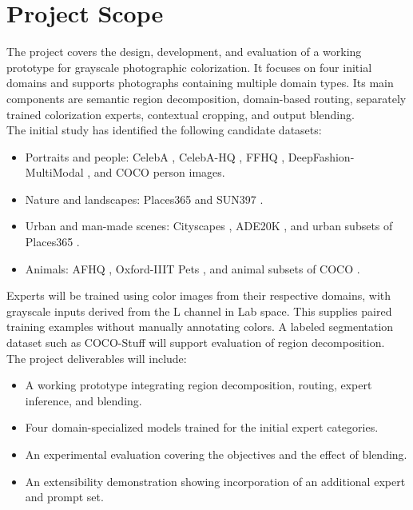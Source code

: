 \documentclass{FastFyp}
\begin{document}
\section{Project Scope}
The project covers the design, development, and evaluation of a working prototype for grayscale photographic colorization. It focuses on four initial domains and supports photographs containing multiple domain types. Its main components are semantic region decomposition, domain-based routing, separately trained colorization experts, contextual cropping, and output blending.\\
The initial study has identified the following candidate datasets:
\begin{itemize}
    \item Portraits and people: CelebA \cite{celeba2015}, CelebA-HQ \cite{pggan2018}, FFHQ \cite{ffhq2019}, DeepFashion-MultiModal \cite{text2human2022}, and COCO \cite{ref19} person images.
    \item Nature and landscapes: Places365 \cite{places365} and SUN397 \cite{sun397}.
    \item Urban and man-made scenes: Cityscapes \cite{ref20}, ADE20K \cite{ref18}, and urban subsets of Places365 \cite{places365}.
    \item Animals: AFHQ \cite{afhq2020}, Oxford-IIIT Pets \cite{pets2012}, and animal subsets of COCO \cite{ref19}.
\end{itemize}
Experts will be trained using color images from their respective domains, with grayscale inputs derived from the L channel in Lab space. This supplies paired training examples without manually annotating colors. A labeled segmentation dataset such as COCO-Stuff \cite{caesar2018cocostuff} will support evaluation of region decomposition.\\
The project deliverables will include:
\begin{itemize}
    \item A working prototype integrating region decomposition, routing, expert inference, and blending.
    \item Four domain-specialized models trained for the initial expert categories.
    \item An experimental evaluation covering the objectives and the effect of blending.
    \item An extensibility demonstration showing incorporation of an additional expert and prompt set.
\end{itemize}
\end{document}
